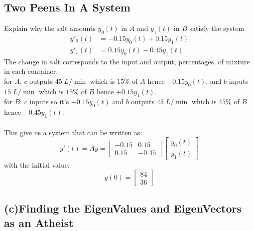 \documentclass[12pt]{article}
\begin{document}
\subsection*{Two Peens In A System}
Explain why the salt amounts $y_0(t)$ in $A$ and $y_1(t)$ in $B$ satisfy the system
\begin{align*}
    y'_0(t) &= -0.15y_0(t) + 0.15y_1(t)\\
    y'_1(t) &= 0.15y_0(t) - 0.45y_1(t)
\end{align*}
The change in salt corresponds to the input and output, percentages, of mixture in each container.\\
for $A$: $c$ outputs $45 \; L \slash\min$ which is $15\%$ of $A$ hence $-0.15y_0(t)$, and $b$ inputs $15 \; L \slash\min$ which is $15\%$ of $B$ hence $+0.15y_1(t)$.\\
for $B$: $c$ inputs so it's $+0.15y_0(t)$ and $b$ outputs $45 \; L \slash\min$ which is $45\%$ of $B$ hence $-0.45y_1(t)$.\\\\
This give us a system that can be written as:
\begin{equation*}
    y'(t)=Ay = \begin{bmatrix}-0.15 & 0.15\\
0.15 & -0.45\end{bmatrix} \begin{bmatrix}y_0(t)\\
y_1(t)\end{bmatrix}
\end{equation*}
with the initial value:
\begin{equation*}
    y(0) = \begin{bmatrix}
        84 \\
        36 
    \end{bmatrix}
\end{equation*}

\subsection*{(c)Finding the EigenValues and EigenVectors as an Atheist}
\end{document}
